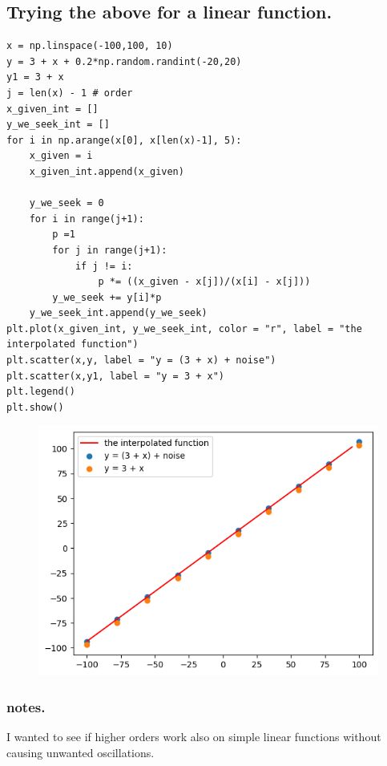 \documentclass{article}
\begin{document}
\subsection{Trying the above for a linear function.}
\begin{verbatim}
x = np.linspace(-100,100, 10)
y = 3 + x + 0.2*np.random.randint(-20,20)
y1 = 3 + x
j = len(x) - 1 # order
x_given_int = []
y_we_seek_int = []
for i in np.arange(x[0], x[len(x)-1], 5):
    x_given = i
    x_given_int.append(x_given)

    y_we_seek = 0
    for i in range(j+1):
        p =1
        for j in range(j+1):
            if j != i:
                p *= ((x_given - x[j])/(x[i] - x[j]))
        y_we_seek += y[i]*p
    y_we_seek_int.append(y_we_seek)
plt.plot(x_given_int, y_we_seek_int, color = "r", label = "the interpolated function")
plt.scatter(x,y, label = "y = (3 + x) + noise")
plt.scatter(x,y1, label = "y = 3 + x")
plt.legend()
plt.show()
\end{verbatim}
\begin{figure}[H]
    \centering
\includegraphics[scale = 0.8]{HighOrderLin.png}
\end{figure}
\subsubsection*{notes.}
I wanted to see if higher orders work also on simple linear functions without causing unwanted oscillations.
\end{document}
